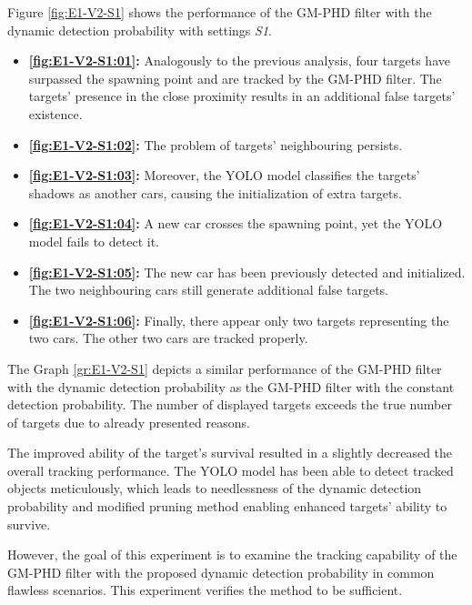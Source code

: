 Figure \ref{fig:E1-V2-S1} shows the performance of the GM-PHD filter with the dynamic detection probability with settings \textit{S1}.
\begin{itemize}
    \item \textbf{\ref{fig:E1-V2-S1:01}:} Analogously to the previous analysis, four targets have surpassed the
    spawning point and are tracked by the GM-PHD filter. The targets' presence in the close proximity results in an
    additional false targets' existence.
    \item \textbf{\ref{fig:E1-V2-S1:02}:} The problem of targets' neighbouring persists.
    \item \textbf{\ref{fig:E1-V2-S1:03}:} Moreover, the YOLO model classifies the targets' shadows as another cars,
    causing the initialization of extra targets.
    \item \textbf{\ref{fig:E1-V2-S1:04}:} A new car crosses the spawning point, yet the YOLO model fails to detect it.
    \item \textbf{\ref{fig:E1-V2-S1:05}:} The new car has been previously detected and initialized. The two
    neighbouring cars still generate additional false targets.
    \item \textbf{\ref{fig:E1-V2-S1:06}:} Finally, there appear only two targets representing the two cars. The other
    two
    cars are tracked properly.
\end{itemize}

The Graph \ref{gr:E1-V2-S1} depicts a similar performance of the GM-PHD filter with the dynamic detection probability as
the GM-PHD filter with the constant detection probability. The number of displayed targets exceeds the true number of
targets due to already presented reasons.


The improved ability of the target's survival resulted in a slightly decreased the overall tracking performance. The
YOLO model
has been able to detect tracked objects meticulously, which leads to needlessness of the dynamic detection
probability
and modified pruning method enabling enhanced targets' ability to survive.

However, the goal of this experiment is to examine the tracking capability of the GM-PHD filter with the proposed
dynamic
detection probability in common flawless scenarios. This experiment verifies the method to be sufficient.

